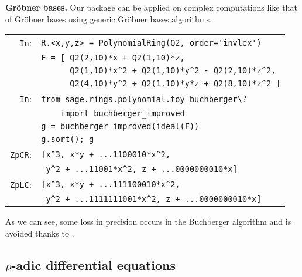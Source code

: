\documentclass[sigconf]{acmart}
\newcommand{\ZpFP}{\text{\color{output} \rm \tt ZpFP}\xspace}
\newcommand{\ZpL}{\text{\color{output} \rm \tt ZpL}\xspace}
\newcommand{\cIn}{{\color{input} \tt \phantom{Zp}In}:}
\newcommand{\cZpCR}{{\color{output} \tt ZpCR}:}
\newcommand{\cZpLC}{{\color{output} \tt ZpLC}:}
\theoremstyle{definition}
\begin{document}
\medskip

\noindent \textbf{Gröbner bases.}
%
Our package can be applied on complex computations like that of Gröbner 
bases using generic Gröbner bases algorithms.

\smallskip

{\noindent \small
\begin{tabular}{@{}rl}
\cIn
 & \verb?R.<x,y,z> = ?{\color{constructor}\verb?PolynomialRing?}\verb?(?{\color{ring}\verb?Q2?}\verb?, order=?{\color{string}\verb?'invlex'?}\verb?)? \\
 & \verb?F = [ ?{\color{ring}\verb?Q2?}\verb?(2,10)*x + ?{\color{ring}\verb?Q2?}\verb?(1,10)*z, ? \\
 & \verb?      ?{\color{ring}\verb?Q2?}\verb?(1,10)*x^2 + ?{\color{ring}\verb?Q2?}\verb?(1,10)*y^2 - ?{\color{ring}\verb?Q2?}\verb?(2,10)*z^2,? \\
 & \verb?      ?{\color{ring}\verb?Q2?}\verb?(4,10)*y^2 + ?{\color{ring}\verb?Q2?}\verb?(1,10)*y*z + ?{\color{ring}\verb?Q2?}\verb?(8,10)*z^2 ]? \\
\cIn
 & {\color{keyword}\verb?from?}\verb? sage.rings.polynomial.toy_buchberger\?\\
 & \verb?    ?{\color{keyword}\verb?import?}\verb? ?{\color{function}\verb?buchberger_improved?} \\
 & \verb?g = ?{\color{function}\verb?buchberger_improved?}\verb?(ideal(F))? \\
 & \verb?g.?{\color{method}\verb?sort?}\verb?(); g? \\
\cZpCR
 & \verb?[x^3, x*y + ...1100010*x^2,? \\
 & \verb? y^2 + ...11001*x^2, z + ...0000000010*x]? \\
\cZpLC
 & \verb?[x^3, x*y + ...111100010*x^2,? \\
 & \verb? y^2 + ...1111111001*x^2, z + ...0000000010*x]? \\
\end{tabular}}

\smallskip

\noindent
As we can see, some loss in precision occurs in the
Buchberger algorithm and is avoided thanks to \ZpL.

\subsection{$p$-adic differential equations}
\label{ssec:diffeq}
\end{document}
